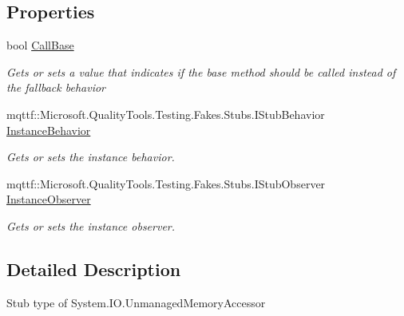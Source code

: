 \subsection*{Properties}
\begin{DoxyCompactItemize}
\item 
bool \hyperlink{class_system_1_1_i_o_1_1_fakes_1_1_stub_unmanaged_memory_accessor_ab6e4df3d384f8fa5852c00925f732934}{Call\-Base}
\begin{DoxyCompactList}\small\item\em Gets or sets a value that indicates if the base method should be called instead of the fallback behavior\end{DoxyCompactList}\item 
mqttf\-::\-Microsoft.\-Quality\-Tools.\-Testing.\-Fakes.\-Stubs.\-I\-Stub\-Behavior \hyperlink{class_system_1_1_i_o_1_1_fakes_1_1_stub_unmanaged_memory_accessor_a0b4671256a8da3abe425db05e8dc09bb}{Instance\-Behavior}
\begin{DoxyCompactList}\small\item\em Gets or sets the instance behavior.\end{DoxyCompactList}\item 
mqttf\-::\-Microsoft.\-Quality\-Tools.\-Testing.\-Fakes.\-Stubs.\-I\-Stub\-Observer \hyperlink{class_system_1_1_i_o_1_1_fakes_1_1_stub_unmanaged_memory_accessor_a409fdcafc3ce0c888f35d219346494b6}{Instance\-Observer}
\begin{DoxyCompactList}\small\item\em Gets or sets the instance observer.\end{DoxyCompactList}\end{DoxyCompactItemize}


\subsection{Detailed Description}
Stub type of System.\-I\-O.\-Unmanaged\-Memory\-Accessor



